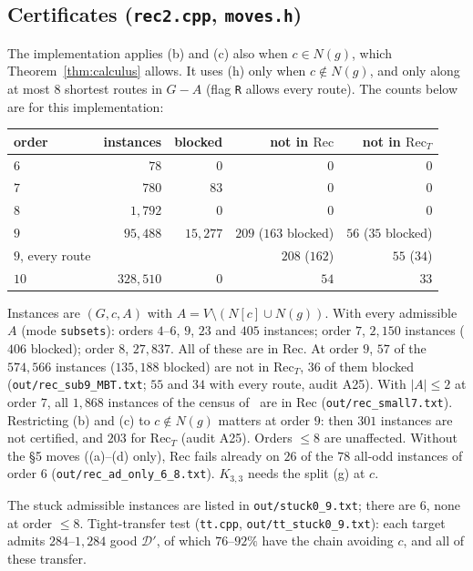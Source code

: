 \documentclass[11pt]{amsart}
\theoremstyle{definition}
\newcommand{\cD}{\mathcal D}
\begin{document}
\subsection*{Certificates (\texttt{rec2.cpp}, \texttt{moves.h})}
The implementation applies (b) and (c) also when $c\in N(g)$, which Theorem~\ref{thm:calculus}
allows. It uses (h) only when $c\notin N(g)$, and only along at most $8$ shortest routes in $G-A$
(flag \texttt{R} allows every route). The counts below are for this implementation:
\begin{center}
\begin{tabular}{lrrrr}
\toprule
order & instances & blocked & not in $\mathrm{Rec}$ & not in $\mathrm{Rec}_T$\\
\midrule
$6$ & $78$ & $0$ & $0$ & $0$\\
$7$ & $780$ & $83$ & $0$ & $0$\\
$8$ & $1{,}792$ & $0$ & $0$ & $0$\\
$9$ & $95{,}488$ & $15{,}277$ & $209$ ($163$ blocked) & $56$ ($35$ blocked)\\
$9$, every route & & & $208$ ($162$) & $55$ ($34$)\\
$10$ & $328{,}510$ & $0$ & $54$ & $33$\\
\bottomrule
\end{tabular}
\end{center}
Instances are $(G,c,A)$ with $A=V\setminus(N[c]\cup N(g))$. With every admissible $A$ (mode
\texttt{subsets}): orders $4$--$6$, $9$, $23$ and $405$ instances; order $7$, $2{,}150$ instances ($406$
blocked); order $8$, $27{,}837$. All of these are in $\mathrm{Rec}$. At order $9$, $57$ of the
$574{,}566$ instances ($135{,}188$ blocked) are not in $\mathrm{Rec}_T$, $36$ of them blocked
(\texttt{out/rec\_sub9\_MBT.txt}; $55$ and $34$ with every route, audit A25). With $|A|\le2$ at
order $7$, all $1{,}868$ instances of the census of~\cite{L1S} are in $\mathrm{Rec}$
(\texttt{out/rec\_small7.txt}). Restricting (b) and (c) to $c\notin N(g)$ matters at order $9$: then
$301$ instances are not certified, and $203$ for $\mathrm{Rec}_T$ (audit A25). Orders $\le8$ are
unaffected. Without the \S5 moves ((a)--(d) only), Rec fails already on $26$ of the $78$ all-odd
instances of order $6$ (\texttt{out/rec\_ad\_only\_6\_8.txt}). $K_{3,3}$ needs the split (g) at
$c$.

The stuck admissible instances are listed in \texttt{out/stuck0\_9.txt}; there are $6$, none at order
$\le8$. Tight-transfer test (\texttt{tt.cpp}, \texttt{out/tt\_stuck0\_9.txt}): each target admits
$284$--$1{,}284$ good $\cD'$, of which $76$--$92\%$ have the chain avoiding $c$, and all of these
transfer.
\end{document}
